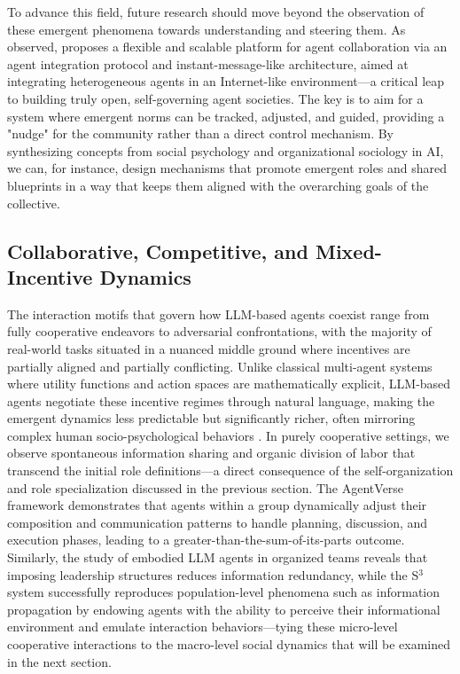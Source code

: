 \documentclass[11pt,a4paper]{article}
\begin{document}
To advance this field, future research should move beyond the observation of these emergent phenomena towards understanding and steering them. As observed, \cite{arxiv:2407.07061v2} proposes a flexible and scalable platform for agent collaboration via an agent integration protocol and instant-message-like architecture, aimed at integrating heterogeneous agents in an Internet-like environment---a critical leap to building truly open, self-governing agent societies. The key is to aim for a system where emergent norms can be tracked, adjusted, and guided, providing a "nudge" for the community rather than a direct control mechanism. By synthesizing concepts from social psychology and organizational sociology in AI, we can, for instance, design mechanisms that promote emergent roles and shared blueprints in a way that keeps them aligned with the overarching goals of the collective.


\subsection{Collaborative, Competitive, and Mixed-Incentive Dynamics}


The interaction motifs that govern how LLM-based agents coexist range from fully cooperative endeavors to adversarial confrontations, with the majority of real-world tasks situated in a nuanced middle ground where incentives are partially aligned and partially conflicting. Unlike classical multi-agent systems where utility functions and action spaces are mathematically explicit, LLM-based agents negotiate these incentive regimes through natural language, making the emergent dynamics less predictable but significantly richer, often mirroring complex human socio-psychological behaviors \cite{arxiv:2310.02124v2}. In purely cooperative settings, we observe spontaneous information sharing and organic division of labor that transcend the initial role definitions---a direct consequence of the self-organization and role specialization discussed in the previous section. The AgentVerse framework \cite{arxiv:2308.10848v3} demonstrates that agents within a group dynamically adjust their composition and communication patterns to handle planning, discussion, and execution phases, leading to a greater-than-the-sum-of-its-parts outcome. Similarly, the study of embodied LLM agents in organized teams \cite{arxiv:2403.12482v1} reveals that imposing leadership structures reduces information redundancy, while the S$^{3}$ system \cite{arxiv:2307.14984v2} successfully reproduces population-level phenomena such as information propagation by endowing agents with the ability to perceive their informational environment and emulate interaction behaviors---tying these micro-level cooperative interactions to the macro-level social dynamics that will be examined in the next section.
\end{document}

